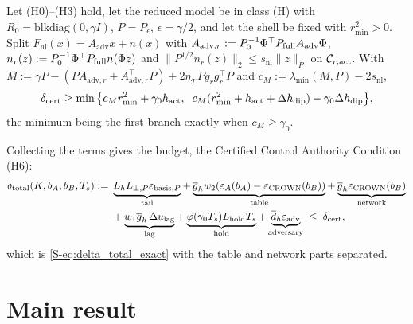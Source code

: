 \begin{lemma}
\label{lem:cert}
\label{lem:delta_cert_classH}
Let (H0)--(H3) hold, let the reduced model be in class (H) with $R_0 = \mathrm{blkdiag}(0, \gamma I)$, $P = P_\epsilon$, $\epsilon = \gamma/2$, and let the shell be fixed with $r_{\min}^2 > 0$. Split $F_{\mathrm{nl}}(x) = A_{\mathrm{adv}}x + n(x)$ with $A_{\mathrm{adv},r} := P_0^{-1}\Phi^\top P_{\mathrm{full}} A_{\mathrm{adv}}\Phi$, $n_r(z) := P_0^{-1}\Phi^\top P_{\mathrm{full}} n(\Phi z)$ and $\|P^{1/2}n_r(z)\|_2 \le s_{\mathrm{nl}}\|z\|_P$ on $\mathcal{C}_{r,\mathrm{act}}$. With $M := \gamma P - (PA_{\mathrm{adv},r} + A_{\mathrm{adv},r}^\top P) + 2\eta_{\mathcal{T}}Pg_rg_r^\top P$ and $c_M := \lambda_{\min}(M, P) - 2s_{\mathrm{nl}}$,
\[
\delta_{\mathrm{cert}} \ge \min\big\{c_Mr_{\min}^2 + \gamma_0h_{\mathrm{act}},\;\; c_M(r_{\min}^2 + h_{\mathrm{act}} + \Delta h_{\mathrm{dip}}) - \gamma_0\Delta h_{\mathrm{dip}}\big\},
\]
the minimum being the first branch exactly when $c_M \ge \gamma_0$.
\end{lemma}

Collecting the terms gives the budget, the Certified Control Authority Condition (H6):
\begin{equation}
\label{eq:budget}
\begin{aligned}
\delta_{\mathrm{total}}(K, b_A, b_B, T_s) :=\;&
\underbrace{L_hL_{\perp,P}\varepsilon_{\mathrm{basis},P}}_{\text{tail}}
+ \underbrace{\overline{g}_h w_2(\varepsilon_A(b_A) - \varepsilon_{\mathrm{CROWN}}(b_B))}_{\text{table}}
+ \underbrace{\overline{g}_h\varepsilon_{\mathrm{CROWN}}(b_B)}_{\text{network}}\\
&
+ \underbrace{w_1\overline{g}_h\,\Delta u_{\mathrm{lag}}}_{\text{lag}}
+ \underbrace{\varphi(\gamma_0T_s)L_{\mathrm{hold}} T_s}_{\text{hold}}
+ \underbrace{\overline{d}_h\varepsilon_{\mathrm{adv}}}_{\text{adversary}}
\;\le\; \delta_{\mathrm{cert}} ,
\end{aligned}
\end{equation}
which is \eqref{S-eq:delta_total_exact} with the table and network parts separated.

\section{Main result}
\label{sec:main}

